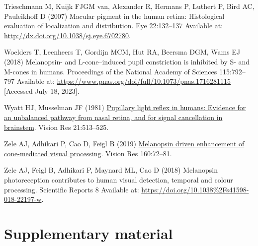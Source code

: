 \documentclass[
]{article}
\newlength{\cslhangindent}
\newenvironment{CSLReferences}[2] %
 {\begin{list}{}{%
  \setlength{\itemindent}{0pt}
  \setlength{\leftmargin}{0pt}
  \setlength{\parsep}{0pt}
  \ifodd #1
   \setlength{\leftmargin}{\cslhangindent}
   \setlength{\itemindent}{-1\cslhangindent}
  \fi
  \setlength{\itemsep}{#2\baselineskip}}}
 {\end{list}}
\begin{document}
\begin{CSLReferences}{1}{1}
Trieschmann M, Kuijk FJGM van, Alexander R, Hermans P, Luthert P, Bird AC, Pauleikhoff D (2007) Macular pigment in the human retina: Histological evaluation of localization and distribution. Eye 22:132--137 Available at: \url{http://dx.doi.org/10.1038/sj.eye.6702780}.

Woelders T, Leenheers T, Gordijn MCM, Hut RA, Beersma DGM, Wams EJ (2018) Melanopsin- and {L}-cone--induced pupil constriction is inhibited by {S}- and {M}-cones in humans. Proceedings of the National Academy of Sciences 115:792--797 Available at: \url{https://www.pnas.org/doi/full/10.1073/pnas.1716281115} {[}Accessed July 18, 2023{]}.

Wyatt HJ, Musselman JF (1981) \href{https://doi.org/10.1016/0042-6989(81)90097-3}{Pupillary light reflex in humans: Evidence for an unbalanced pathway from nasal retina, and for signal cancellation in brainstem}. Vision Res 21:513--525.

Zele AJ, Adhikari P, Cao D, Feigl B (2019) \href{https://doi.org/10.1016/j.visres.2019.04.009}{Melanopsin driven enhancement of cone-mediated visual processing}. Vision Res 160:72--81.

Zele AJ, Feigl B, Adhikari P, Maynard ML, Cao D (2018) Melanopsin photoreception contributes to human visual detection, temporal and colour processing. Scientific Reports 8 Available at: \url{https://doi.org/10.1038\%2Fs41598-018-22197-w}.

\end{CSLReferences}

\section{Supplementary material}\label{supplementary-material}

\setcounter{table}{0} \renewcommand{\thetable}{S\arabic{table}} \setcounter{figure}{0} \renewcommand{\thefigure}{S\arabic{figure}}
\end{document}
